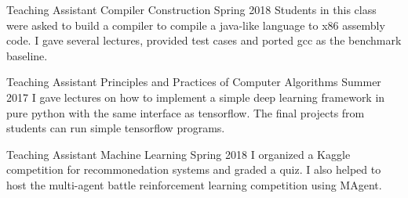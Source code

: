 

\begin{cventries}

  \cventry
    {Teaching Assistant} %
    {Compiler Construction  } %
    {Spring 2018} %
    {} %
    {Students in this class were asked to build a compiler to compile a java-like language to x86 assembly code. I gave several lectures, provided test cases and ported gcc as the benchmark baseline.}

  \cventry
	{Teaching Assistant} %
	{Principles and Practices of Computer Algorithms } %
	{Summer 2017} %
	{} %
	{I gave lectures on how to implement a simple deep learning framework in pure python with the same interface as tensorflow. The final projects from students can run simple tensorflow programs.}

  \cventry
	{Teaching Assistant} %
	{Machine Learning } %
	{Spring 2018} %
	{} %
	{I organized a Kaggle competition for recommonedation systems and graded a quiz. I also helped to host the multi-agent battle reinforcement learning competition using MAgent.}





\end{cventries}
